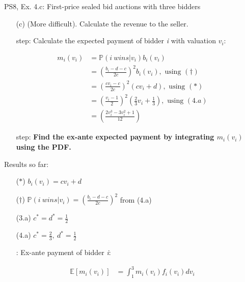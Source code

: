 \begin{frame}{PS8, Ex. 4.c: First-price sealed bid auctions with three bidders}
    \begin{itemize}
      \item[(c)] (More difficult). Calculate the revenue to the seller.
    \end{itemize}
    \vspace{-8pt}
    \begin{multicols}{2}
      \begin{itemize}
        \item[\nth{1} step:] Calculate the expected payment of bidder \textit{i} with valuation $v_i$:
      \end{itemize}
      \vspace{-10pt}
      \begin{align*}
        m_i(v_i)&=\mathbb{P}(i\ wins|v_i)b_i(v_i)\\
                &=\left(\frac{b_i-d-c}{2c}\right)^2b_i(v_i),\text{ using }(\dagger)\\
                &=\left(\frac{cv_i-c}{2c}\right)^2(cv_i+d),\text{ using }(*)\\
                &=\left(\frac{v_i-1}{2}\right)^2\left(\frac{2}{3}v_i+\frac{1}{3}\right),\text{ using }(4.a)\\
                &=\left(\frac{2v_i^3-3v_i^2+1}{12}\right)
      \end{align*}
      \vspace{-10pt}
      \begin{itemize}
        \item[\nth{2} step:] \textbf{Find the ex-ante expected payment by integrating $m_i(v_i)$ using the PDF.}
      \end{itemize}
      \vfill\null\columnbreak
      Results so far:
      \vspace{-6pt}
      \begin{itemize}
        \item[($*$)] $b_i(v_i) = cv_i+d$
        \item[($\dagger$)] $\mathbb{P}(i\ wins|v_i)=\left(\frac{b_i-d-c}{2c}\right)^2$ from (4.a)
        \item[(3.a)] $c^*=d^*=\frac{1}{2}$
        \item[(4.a)] $c^*=\frac{2}{3},\ d^*=\frac{1}{2}$
        \item[\nth{2}:] Ex-ante payment of bidder \textit{i}:
      \end{itemize}
      \vspace{-12pt}
      \begin{align*}
        \mathbb{E}[m_i(v_i)]&=\textstyle\int_1^3m_i(v_i)f_i(v_i)dv_i
      \end{align*}
      \vfill\null
    \end{multicols}
    \vfill\null
\end{frame}
